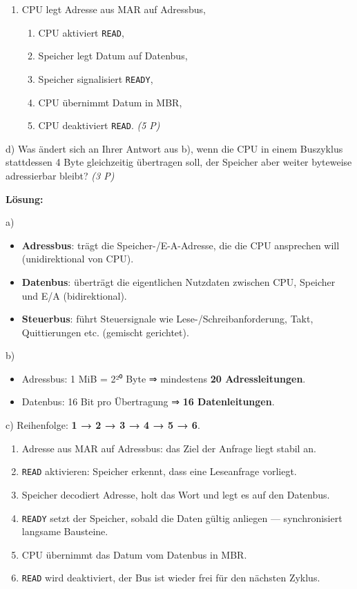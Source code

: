 \documentclass[11pt, a4paper]{article}
\begin{document}
\begin{enumerate}
  \item CPU legt Adresse aus MAR auf Adressbus,
\begin{enumerate}
  \item CPU aktiviert \texttt{READ},
  \item Speicher legt Datum auf Datenbus,
  \item Speicher signalisiert \texttt{READY},
  \item CPU übernimmt Datum in MBR,
  \item CPU deaktiviert \texttt{READ}. \textit{(5 P)}
\end{enumerate}
\end{enumerate}

d) Was ändert sich an Ihrer Antwort aus b), wenn die CPU in einem Buszyklus stattdessen 4 Byte gleichzeitig übertragen soll, der Speicher aber weiter byteweise adressierbar bleibt? \textit{(3 P)}


\textbf{Lösung:}


a)

\begin{itemize}
  \item \textbf{Adressbus}: trägt die Speicher-/E-A-Adresse, die die CPU ansprechen will (unidirektional von CPU).
  \item \textbf{Datenbus}: überträgt die eigentlichen Nutzdaten zwischen CPU, Speicher und E/A (bidirektional).
  \item \textbf{Steuerbus}: führt Steuersignale wie Lese-/Schreibanforderung, Takt, Quittierungen etc. (gemischt gerichtet).
\end{itemize}

b)

\begin{itemize}
  \item Adressbus: 1 MiB = 2²⁰ Byte ⇒ mindestens \textbf{20 Adressleitungen}.
  \item Datenbus: 16 Bit pro Übertragung ⇒ \textbf{16 Datenleitungen}.
\end{itemize}

c) Reihenfolge: \textbf{1 → 2 → 3 → 4 → 5 → 6}.

\begin{enumerate}
  \item Adresse aus MAR auf Adressbus: das Ziel der Anfrage liegt stabil an.
  \item \texttt{READ} aktivieren: Speicher erkennt, dass eine Leseanfrage vorliegt.
  \item Speicher decodiert Adresse, holt das Wort und legt es auf den Datenbus.
  \item \texttt{READY} setzt der Speicher, sobald die Daten gültig anliegen — synchronisiert langsame Bausteine.
  \item CPU übernimmt das Datum vom Datenbus in MBR.
  \item \texttt{READ} wird deaktiviert, der Bus ist wieder frei für den nächsten Zyklus.
\end{enumerate}
\end{document}
